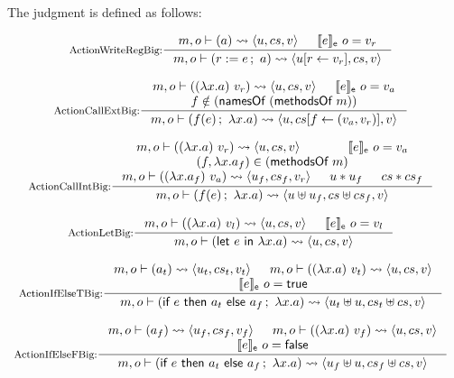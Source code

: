 \begin{definition}
  \label{def-sembigact}
  The judgment  is defined as follows:
  \begin{center}
    \begin{math}
      \begin{array}{c}
        \inference[ActionWriteRegBig:]{\sembigact{m}{o}{a}{u}{cs}{v}
          & \semexpr{e}{o} = v_r} %
                  {\sembigact{m}{o}{\actwrite{r}{e}{a}}{\stupd{u}{r}{v_r}}{cs}{v}} \\
        \mbox{} \\
        \inference[ActionCallExtBig:]{\sembigact{m}{o}{(\lambda x.a)\ v_r}{u}{cs}{v}
          & \semexpr{e}{o} = v_a \\
          f \notin (\namesof{(\methsofm{m})})}
                  {\sembigact{m}{o}{\actcall{x}{f}{e}{a}}{u}{\lblupd{cs}{f}{(v_a, v_r)}}{v}} \\
        \mbox{} \\
        \inference[ActionCallIntBig:]{\sembigact{m}{o}{(\lambda x.a)\ v_r}{u}{cs}{v}
          & \semexpr{e}{o} = v_a \\
          (f, \lambda x.a_f) \in (\methsofm{m}) \\
          \sembigact{m}{o}{(\lambda x.a_f)\ v_a}{u_f}{cs_f}{v_r}
          & \sdisj{u}{u_f}
          & \ldisj{cs}{cs_f}
        }
                  {\sembigact{m}{o}{\actcall{x}{f}{e}{a}}{\splus{u}{u_f}}{\lplus{cs}{cs_f}}{v}} \\
        \mbox{} \\
        \inference[ActionLetBig:]{\sembigact{m}{o}{(\lambda x.a)\ v_l}{u}{cs}{v} & \semexpr{e}{o} = v_l}
                  {\sembigact{m}{o}{\actlet{e}{x}{a}}{u}{cs}{v}} \\
        \mbox{} \\
        \inference[ActionIfElseTBig:]{\sembigact{m}{o}{a_t}{u_t}{cs_t}{v_t} &
          \sembigact{m}{o}{(\lambda x.a)\ v_t}{u}{cs}{v} \\
          \semexpr{e}{o} = \btrue{}}
                  {\sembigact{m}{o}{\actifelse{e}{a_t}{a_f}{x}{a}}{\splus{u_t}{u}}{\splus{cs_t}{cs}}{v}} \\
        \mbox{} \\
        \inference[ActionIfElseFBig:]{\sembigact{m}{o}{a_f}{u_f}{cs_f}{v_f} &
          \sembigact{m}{o}{(\lambda x.a)\ v_f}{u}{cs}{v} \\
          \semexpr{e}{o} = \bfalse{}}
                  {\sembigact{m}{o}{\actifelse{e}{a_t}{a_f}{x}{a}}{\splus{u_f}{u}}{\splus{cs_f}{cs}}{v}} \\

\end{array}
\end{math}
\end{center}
\end{definition}
